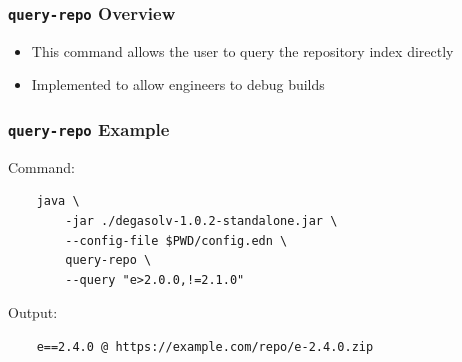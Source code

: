 \documentclass{beamer}
\begin{document}
\begin{frame}
  \frametitle{\texttt{query-repo} Overview}
  \begin{itemize}
  \item This command allows the user to query the repository index directly
  \item Implemented to allow engineers to debug builds
  \end{itemize}
\end{frame}
\begin{frame}[fragile]
  \frametitle{\texttt{query-repo} Example}
  Command:
\begin{verbatim}
    java \
        -jar ./degasolv-1.0.2-standalone.jar \
        --config-file $PWD/config.edn \
        query-repo \
        --query "e>2.0.0,!=2.1.0"
\end{verbatim}
  Output:
\begin{verbatim}
    e==2.4.0 @ https://example.com/repo/e-2.4.0.zip
\end{verbatim}
\end{frame}
\end{document}
